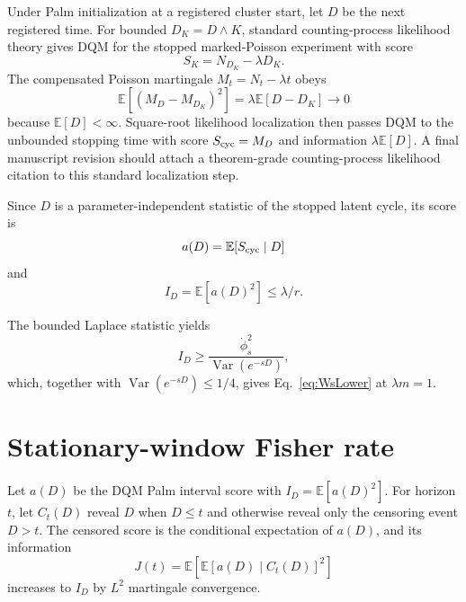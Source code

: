 \documentclass[aps,prapplied,preprint,nofootinbib]{revtex4-2}
\newcommand{\E}{\mathbb E}
\begin{document}
Under Palm initialization at a registered cluster start, let $D$ be the next registered time. For bounded $D_K=D\wedge K$, standard counting-process likelihood theory gives DQM for the stopped marked-Poisson experiment with score
\begin{equation}
S_K=N_{D_K}-\lambda D_K.
\end{equation}
The compensated Poisson martingale $M_t=N_t-\lambda t$ obeys
\begin{equation}
\E[(M_D-M_{D_K})^2]
=\lambda\E[D-D_K]\to0
\end{equation}
because $\E[D]<\infty$. Square-root likelihood localization then passes DQM to the unbounded stopping time with score $S_{\rm cyc}=M_D$ and information $\lambda\E[D]$. A final manuscript revision should attach a theorem-grade counting-process likelihood citation to this standard localization step.

Since $D$ is a parameter-independent statistic of the stopped latent cycle, its score is
\begin{equation}
a(D)=\E[S_{\rm cyc}\mid D]
\end{equation}
and
\begin{equation}
I_D=\E[a(D)^2]\le\lambda/r.
\end{equation}

The bounded Laplace statistic yields
\begin{equation}
I_D
\ge
\frac{\dot\phi_s^2}{\operatorname{Var}(e^{-sD})},
\end{equation}
which, together with $\operatorname{Var}(e^{-sD})\le1/4$, gives Eq.~\eqref{eq:WsLower} at $\lambda m=1$.

\section{Stationary-window Fisher rate}
\label{app:window}

Let $a(D)$ be the DQM Palm interval score with $I_D=\E[a(D)^2]$. For horizon $t$, let $C_t(D)$ reveal $D$ when $D\le t$ and otherwise reveal only the censoring event $D>t$. The censored score is the conditional expectation of $a(D)$, and its information
\begin{equation}
J(t)=\E\left[\E[a(D)\mid C_t(D)]^2\right]
\end{equation}
increases to $I_D$ by $L^2$ martingale convergence.
\end{document}
